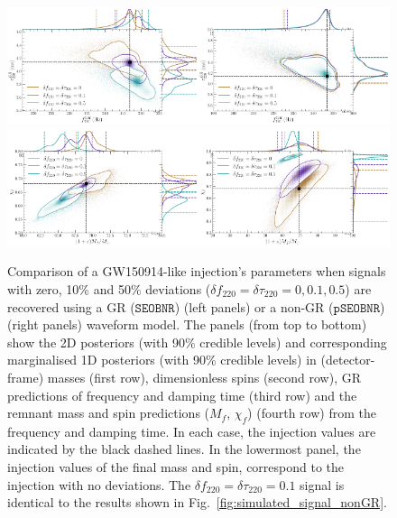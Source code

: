 \documentclass[twocolumn,prd,aps,superscriptaddress,preprintnumbers,tightenlines,showpacs,nofootinbib,eqsecnum,amsfonts,amsmath]{revtex4-1}
\newcommand{\df}[1]{\delta f_{\text{#1}}}
\newcommand{\dtau}[1]{\delta \tau_{\text{#1}}}
\newcommand{\pSEOB}{\texttt{pSEOBNR}}
\newcommand{\SEOB}{\texttt{SEOBNR}}
\begin{document}
\begin{figure}
        \includegraphics[width=0.5\textwidth]{figures/GW150914_simulated_signal_0p0_0p1_0p5_gr_fgrtaugr.png}\includegraphics[width=0.5\textwidth]{figures/GW150914_simulated_signal_0p0_0p1_0p5_ngr_fgrtaugr.png}
        \includegraphics[width=0.5\textwidth]{figures/GW150914_simulated_signal_0p0_0p1_0p5_gr_Mfaf.png}\includegraphics[width=0.5\textwidth]{figures/GW150914_simulated_signal_0p0_0p1_0p5_ngr_Mfaf.png}
         \caption{Comparison of a GW150914-like injection's parameters when signals with zero, 10\% and 50\% deviations ($\df{220} = \dtau{220} = 0, 0.1, 0.5$) are recovered using a GR ($\SEOB$) (left panels) or a non-GR ($\pSEOB$) (right panels) waveform model. The panels (from top to bottom) show the 2D posteriors (with 90\% credible levels) and corresponding marginalised 1D posteriors (with 90\% credible levels) in (detector-frame) masses (first row), dimensionless spins (second row), GR predictions of frequency and damping time (third row) and the remnant mass and spin predictions ($M_f$, $\chi_f$) (fourth row) from the frequency and damping time. In each case, the injection values are indicated by the black dashed lines. In the lowermost panel, the injection values of the final mass and spin, correspond to the injection with no deviations. The $\df{220} = \dtau{220} = 0.1$ signal is identical to the results shown in Fig.~\ref{fig:simulated_signal_nonGR}.}
        \label{fig:gr_ngr_comparison}
\end{figure}
\end{document}
